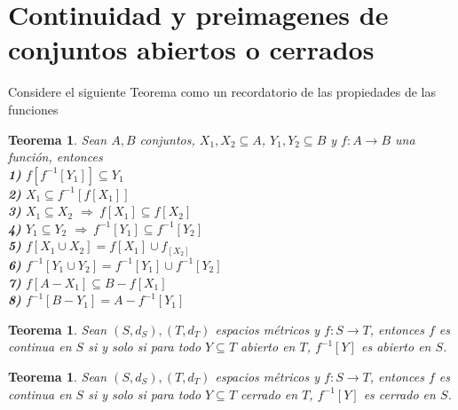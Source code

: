 \documentclass[oneside]{book} %
\theoremstyle{Teorema}
\newtheorem{Teorema}[Definicion]{Teorema}
\theoremstyle{Ejemplos}
\theoremstyle{[Obs]}
\renewcommand{\{}{\left\lbrace} %
\renewcommand{\}}{\right\rbrace} %
\renewcommand{\u}{\cup} %
\renewcommand{\sc}{\subseteq} %
\newcommand{\Imp}{$\Rightarrow\ $} %
\begin{document}
		\section{Continuidad y preimagenes de conjuntos abiertos o cerrados}

			Considere el siguiente Teorema como un recordatorio de las propiedades de las funciones \\

			\begin{Teorema}
				
				Sean $A, B$ conjuntos, $X_1, X_2 \sc A$, $Y_1, Y_2 \sc B$ y $f : A \to B$ una función, entonces \\

				\textbf{1)} $f[f^{-1}[Y_1]] \sc Y_1$ \\

				\textbf{2)} $X_1 \sc f^{-1}[f[X_1]]$ \\

				\textbf{3)} $X_1 \sc X_2$ \Imp $f[X_1] \sc f[X_2]$ \\

				\textbf{4)} $Y_1 \sc Y_2$ \Imp $f^{-1}[Y_1] \sc f^{-1}[Y_2]$ \\

				\textbf{5)} $f[X_1 \u X_2] = f[X_1] \u f_[X_2]$ \\

				\textbf{6)} $f^{-1}[Y_1 \u Y_2] = f^{-1}[Y_1] \u f^{-1}[Y_2]$ \\

				\textbf{7)} $f[A - X_1] \sc B - f[X_1]$ \\

				\textbf{8)} $f^{-1}[B - Y_1] = A - f^{-1}[Y_1]$ \\

			\end{Teorema}

			\begin{Teorema}
				
				Sean $(S, d_S), (T, d_T)$ espacios métricos y $f : S \to T$, entonces $f$ es continua en $S$ si y solo si para todo $Y \sc T$ abierto en $T$, $f^{-1}[Y]$ es abierto en $S$. \\

			\end{Teorema}

			\begin{Teorema}
				
				Sean $(S, d_S), (T, d_T)$ espacios métricos y $f : S \to T$, entonces $f$ es continua en $S$ si y solo si para todo $Y \sc T$ cerrado en $T$, $f^{-1}[Y]$ es cerrado en $S$. \\

			\end{Teorema}
\end{document}
